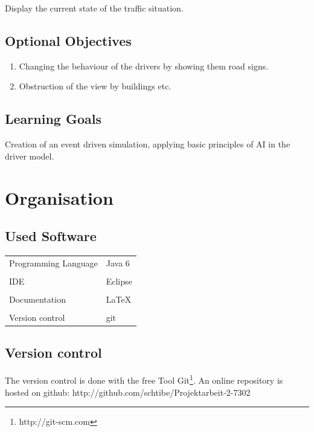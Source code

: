 \documentclass[a4paper,10pt,titlepage]{article}
\begin{document}
Display the current state of the traffic situation. %
\newpage

\subsection{Optional Objectives}
\begin{enumerate}
 \item Changing the behaviour of the drivers by showing them road signs. %
 \item Obstruction of the view by buildings etc. %
\end{enumerate}

\subsection{Learning Goals}
Creation of an event driven simulation, applying basic principles of AI in the driver model.


\section{Organisation}

\subsection{Used Software}
\begin{tabular}{ll}
Programming Language & Java 6 \\
& \\
IDE & Eclipse \\
& \\
Documentation & \LaTeX \\
& \\
Version control & git \\
\end{tabular}

\subsection{Version control}
The version control is done with the free Tool Git\footnote[1]{http://git-scm.com}.
An online repository is hosted on github: \newline
http://github.com/schtibe/Projektarbeit-2-7302
\end{document}
